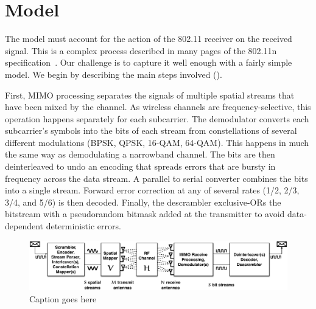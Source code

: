 \ifx\mainfile\undefined

\setcounter{chapter}{3} %
\fi

\cleardoublepage
\chapter{Model}
\label{chap:model}

The model must account for the action of the 802.11 receiver on the received signal. This is a complex process described in many pages of the 802.11n specification~\cite{80211n}. Our challenge is to capture it well enough with a fairly simple model. We begin by describing the main steps involved ().

First, MIMO processing separates the signals of multiple spatial streams that have been mixed by the channel. As wireless channels are frequency-selective, this operation happens separately for each subcarrier. The demodulator converts each subcarrier's symbols into the bits of each stream from constellations of several different modulations (BPSK, QPSK, 16-QAM, 64-QAM). This happens in much the same way as demodulating a narrowband channel. The bits are then deinterleaved to undo an encoding that spreads errors that are bursty in frequency across the data stream. A parallel to serial converter combines the bits into a single stream. Forward error correction at any of several rates (1/2, 2/3, 3/4, and 5/6) is then decoded. Finally, the descrambler exclusive-ORs the bitstream with a pseudorandom bitmask added at the transmitter to avoid data-dependent deterministic errors.

\begin{figure}[ht]
\centering
\includegraphics[width=\textwidth]{figures/11n_link_simplified_bigger_fonts.pdf}
\caption[An 802.11n link]{Caption goes here}
\end{figure}


